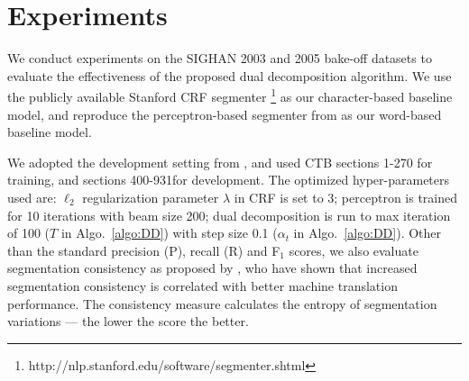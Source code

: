 \section{Experiments}


We conduct experiments on the SIGHAN 2003 \cite{Sproat:2003:SIGHAN} and 2005 \cite{Emerson:2005:SIGHAN} bake-off datasets to evaluate the effectiveness of the proposed dual decomposition algorithm. We use the publicly available Stanford CRF segmenter \cite{Tseng:2005:SIGHAN}\footnote{http://nlp.stanford.edu/software/segmenter.shtml} as our character-based baseline model, and reproduce the perceptron-based segmenter from  as our word-based baseline model.

We adopted the development setting from \cite{Zhang:2007:ACL}, and used CTB sections 1-270 for training, and sections 400-931for development. The optimized hyper-parameters used are: $\ell_{2}$ regularization parameter $\lambda$ in CRF is set to $3$; perceptron is trained for 10 iterations with beam size 200; dual decomposition is run to max iteration of 100 ($T$ in Algo.~\ref{algo:DD}) with step size 0.1 ($\alpha_t$ in Algo.~\ref{algo:DD}). Other than the standard precision (P), recall (R) and F$_1$ scores, we also evaluate segmentation consistency as proposed by \cite{Chang:2008:ACL}, who have shown that increased segmentation consistency is correlated with better machine translation performance. The consistency measure calculates the entropy of segmentation variations --- the lower the score the better. 

